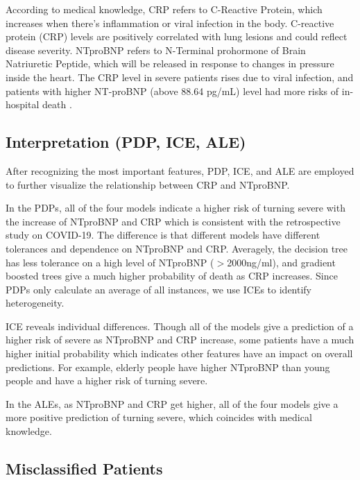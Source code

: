 According to medical knowledge, CRP refers to C-Reactive Protein, which increases when there's inflammation or viral infection in the body. C-reactive protein (CRP) levels are positively correlated with lung lesions and could reflect disease severity\cite{WANG2020332}. NTproBNP refers to N-Terminal prohormone of Brain Natriuretic Peptide, which will be released in response to changes in pressure inside the heart. The CRP level in severe patients rises due to viral infection, and patients with higher NT-proBNP (above 88.64 pg/mL) level had more risks of in-hospital death \cite{Gao2020.03.07.20031575}.


\newpage
\subsection{\textbf{Interpretation (PDP, ICE, ALE)}}

After recognizing the most important features, PDP, ICE, and ALE are employed to further visualize the relationship between CRP and NTproBNP.

In the PDPs, all of the four models indicate a higher risk of turning severe with the increase of NTproBNP and CRP which is consistent with the retrospective study on COVID-19. The difference is that different models have different tolerances and dependence on NTproBNP and CRP. Averagely, the decision tree has less tolerance on a high level of NTproBNP ($>$2000ng/ml), and gradient boosted trees give a much higher probability of death as CRP increases. Since PDPs only calculate an average of all instances, we use ICEs to identify heterogeneity.
    
ICE reveals individual differences. Though all of the models give a prediction of a higher risk of severe as NTproBNP and CRP increase, some patients have a much higher initial probability which indicates other features have an impact on overall predictions. For example, elderly people have higher NTproBNP than young people and have a higher risk of turning severe.

In the ALEs,  as NTproBNP and CRP get higher, all of the four models give a more positive prediction of turning severe, which coincides with medical knowledge.

\clearpage
\subsection{\textbf{Misclassified Patients}}

